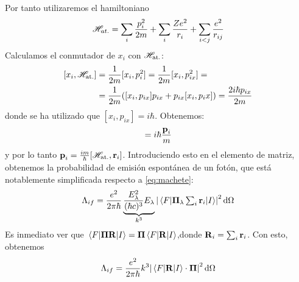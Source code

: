 Por tanto utilizaremos el hamiltoniano
\begin{equation}
  \mathscr{H}_{at.} = \sum_{i} \frac{p_i^2}{2m} + \sum_{i} \frac{Ze^2}{r_i} +
  \sum_{i<j} \frac{e^2}{r_{ij}}
\end{equation}
Calculamos el conmutador de $x_i$ con $\mathscr{H}_\text{at.}$:
\begin{equation}
  \begin{split}
    [x_i,\mathscr{H}_\text{at.}] &= \frac{1}{2m} [x_i,p_i^2] =
    \frac{1}{2m}[x_i,p_{ix}^2] = \\
    &= \frac{1}{2m} ([x_i,p_{ix}]p_{ix}+p_{ix}[x_i,p_ix]) = \frac{2i
      \hbar p_{ix}}{2m}
  \end{split}
\end{equation}
donde se ha utilizado que $[x_i,p_{ix}]=i \hbar$. Obtenemos:
\begin{equation}
  [\boldrm{r}_i,\Ham_\text{at.}] = i \hbar \frac{\boldrm{p}_i}{m}
\end{equation}
y por lo tanto $\bm{\mathrm{p}}_i =
\frac{im}{\hbar}[\mathscr{H}_\text{at.},\bm{\mathrm{r}}_i]$. Introduciendo esto en
el elemento de matriz, obtenemos la probabilidad de emisión espontánea
de un fotón, que está notablemente simplificada respecto a \eqref{eq:machete}:
\begin{equation}
 \Lambda_{if} = \frac{e^2}{2\pi \hbar}
 \underbrace{\frac{E_\lambda^2}{(\hbar c)^3 }E_\lambda}_{k^3}
 \abs{\mel{F}{\bm{\mathrm{\Pi}}_\lambda \textstyle \sum_i \displaystyle
     \bm{\mathrm{r}}_i}{I}}^2 \dd{\Omega}
\end{equation}
Es inmediato ver que $\mel{F}{\bm{\mathrm{\Pi}}\bm{\mathrm{R}}}{I} =
\bm{\mathrm{\Pi}}\mel{F}{\bm{\mathrm{R}}}{I}$,donde $\bm{\mathrm{R}}_i =
\sum_{i}\bm{\mathrm{r}}_i$. Con esto, obtenemos
\begin{equation}
  \Lambda_{if} = \frac{e^2}{2\pi \hbar} k^3
  \abs{\mel{F}{\bm{\mathrm{R}}}{I}\cdot \bm{\mathrm{\Pi}}}^2 \dd{\Omega}
\end{equation}


